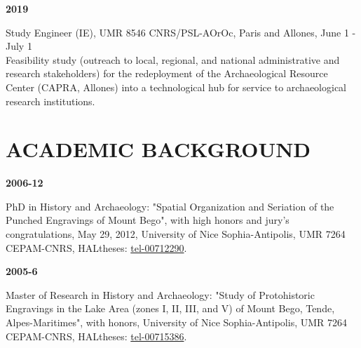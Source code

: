 \documentclass{article}
\newcommand{\fr}[1]{} %
\newcommand{\en}[1]{#1}   %
\begin{document}
\smallbreak
\textbf{2019} 
\fr{Ingénieur d'études (IE), UMR 8546 CNRS/PSL-AOrOc, Paris et Allones, 1er juin - 1er juillet \\ 
\hspace*{0.5cm} Étude de faisabilité (prospection auprès des acteurs administratifs et de recherche, locaux, régionaux et nationaux) pour le redéploiement du Centre de Ressources Archéologique (CAPRA, Allones) en \textit{hub} technologique pour le service aux institutions de recherche en archéologie.}
\en{Study Engineer (IE), UMR 8546 CNRS/PSL-AOrOc, Paris and Allones, June 1 - July 1 \\ 
\hspace*{0.5cm} Feasibility study (outreach to local, regional, and national administrative and research stakeholders) for the redeployment of the Archaeological Resource Center (CAPRA, Allones) into a technological hub for service to archaeological research institutions.}



\section{\fr{PARCOURS ACADÉMIQUE}\en{ACADEMIC BACKGROUND}}

\textbf{2006-12} 
\fr{Doctorat en Histoire et Archéologie: "Organisation spatiale et sériation des gravures piquetées du mont Bego", mention très honorable avec les félicitations du jury, 29 mai 2012, Université Nice Sophia-Antipolis, UMR 7264 CEPAM-CNRS, HALtheses: \href{https://tel.archives-ouvertes.fr/tel-00712290}{tel-00712290}.}
\en{PhD in History and Archaeology: "Spatial Organization and Seriation of the Punched Engravings of Mount Bego", with high honors and jury's congratulations, May 29, 2012, University of Nice Sophia-Antipolis, UMR 7264 CEPAM-CNRS, HALtheses: \href{https://tel.archives-ouvertes.fr/tel-00712290}{tel-00712290}.}

\smallbreak
\textbf{2005-6} 
\fr{Master 2 Recherche en Histoire et Archéologie: "Étude des gravures protohistoriques de la zone des lacs (zones I, II, III et V) de la région du mont Bego, Tende, Alpes-Maritimes", mention bien, Université Nice Sophia-Antipolis, UMR 7264 CEPAM-CNRS, HALtheses: \href{https://tel.archives-ouvertes.fr/tel-00715386}{tel-00715386}.}
\en{Master of Research in History and Archaeology: "Study of Protohistoric Engravings in the Lake Area (zones I, II, III, and V) of Mount Bego, Tende, Alpes-Maritimes", with honors, University of Nice Sophia-Antipolis, UMR 7264 CEPAM-CNRS, HALtheses: \href{https://tel.archives-ouvertes.fr/tel-00715386}{tel-00715386}.}
\end{document}
